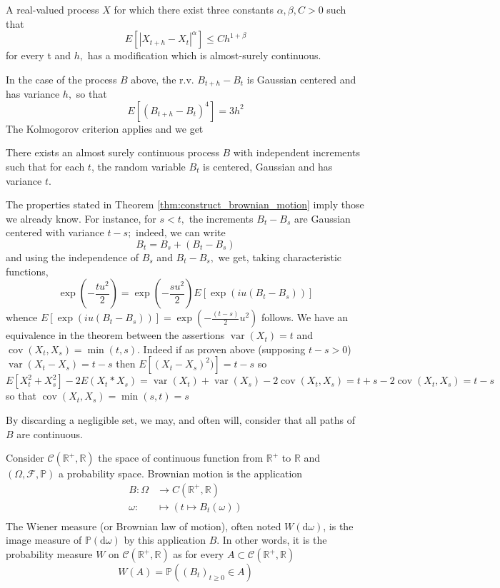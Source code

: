 \begin{theorem}
	A real-valued process $X$ for which there exist three constants $\alpha, \beta, C>0$ such that
	\[
	E\left[\left|X_{t+h}-X_{t}\right|^{\alpha}\right] \leq C h^{1+\beta}
	\]
	for every t and $h,$ has a modification which is almost-surely continuous.
\end{theorem}
In the case of the process $B$ above, the r.v. $B_{t+h}-B_{t}$ is Gaussian centered and has variance $h,$ so that
\[
E\left[\left(B_{t+h}-B_{t}\right)^{4}\right]=3 h^{2}
\]
The Kolmogorov criterion applies and we get
\begin{theorem}\label{thm:construct_brownian_motion}
	There exists an almost surely continuous process $B$ with independent increments such that for each $t$, the random variable $B_{t}$ is centered, Gaussian and has variance $t$.
\end{theorem}
The properties stated in Theorem \eqref{thm:construct_brownian_motion} imply those we already know. For instance, for $s<t,$ the increments $B_{t}-B_{s}$ are Gaussian centered with variance $t-s ;$ indeed, we can write
\[
B_{t}=B_{s}+\left(B_{t}-B_{s}\right)
\]
and using the independence of $B_{s}$ and $B_{t}-B_{s},$ we get, taking characteristic functions,
\[
\exp \left(-\frac{t u^{2}}{2}\right)=\exp \left(-\frac{s u^{2}}{2}\right) E\left[\exp \left(i u\left(B_{t}-B_{s}\right)\right)\right]
\]
whence $E\left[\exp \left(i u\left(B_{t}-B_{s}\right)\right)\right]=\exp \left(-\frac{(t-s)}{2} u^{2}\right)$ follows.
We have an equivalence in the theorem  between the assertions $\operatorname{var}(X_t)=t$ and $\operatorname{cov}(X_t,X_s)=\min(t,s)$. Indeed if as proven above (supposing $t-s>0$) $\operatorname{var}(X_t-X_s)=t-s$  then $E[(X_t-X_s)^2)]=t-s$ so $E[X_t^2+X_s^2]-2E(X_t*X_s)=\operatorname{var}(X_t)+\operatorname{var}(X_s)-2\operatorname{cov}(X_t,X_s)=t+s-2\operatorname{cov}(X_t,X_s)=t-s$ so that $\operatorname{cov}(X_t,X_s)=\min(s,t)=s$

By discarding a negligible set, we may, and often will, consider that all paths of $B$ are continuous.


\begin{definition}
	Consider $\mathcal{C}\left(\mathbb{R}^{+}, \mathbb{R}\right)$ the space of continuous function from  $\mathbb{R}^{+}$ to $\mathbb{R}$ and $(\Omega, \mathcal{F}, \mathbb{P})$ a probability space. Brownian motion is the application
	\begin{align*}
		B: \Omega &\rightarrow C\left(\mathbb{R}^{+}, \mathbb{R}\right)\\
		\omega : &\mapsto \left(t \mapsto B_{t}(\omega)\right)\\
	\end{align*}
The Wiener measure (or Brownian law of motion), often noted $W(\mathrm{d} \omega)$, is the image measure of $\mathbb{P}(\mathrm{d} \omega)$ by this application $B$. In other words, it is the probability measure $W$ on $\mathcal{C}\left(\mathbb{R}^{+}, \mathbb{R}\right)$ as for every
	$A \subset \mathcal{C}\left(\mathbb{R}^{+}, \mathbb{R}\right)$
	\[
	W(A)=\mathbb{P}\left(\left(B_{t}\right)_{t \geq 0} \in A\right)
	\]
\end{definition}


